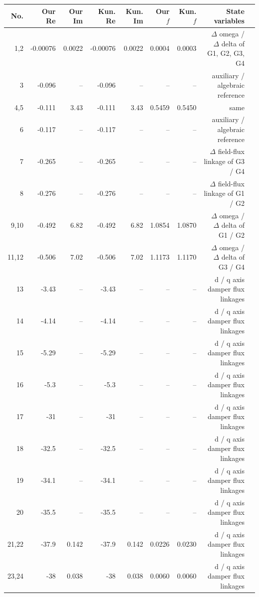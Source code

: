 \begingroup\scriptsize\setlength{\tabcolsep}{3pt}
\begin{tabularx}{\textwidth}{@{}r rrr rrr r X@{}}
\toprule
No. & Our Re & Our Im & Kun. Re & Kun. Im & Our $f$ & Kun. $f$ & State variables\\
\midrule
1,2 & -0.00076 & 0.0022 & -0.00076 & 0.0022 & 0.0004 & 0.0003 & $\Delta$ omega / $\Delta$ delta of G1, G2, G3, G4\\
3 & -0.096 & -- & -0.096 & -- & -- & -- & auxiliary / algebraic reference\\
4,5 & -0.111 & 3.43 & -0.111 & 3.43 & 0.5459 & 0.5450 & same\\
6 & -0.117 & -- & -0.117 & -- & -- & -- & auxiliary / algebraic reference\\
7 & -0.265 & -- & -0.265 & -- & -- & -- & $\Delta$ field-flux linkage of G3 / G4\\
8 & -0.276 & -- & -0.276 & -- & -- & -- & $\Delta$ field-flux linkage of G1 / G2\\
9,10 & -0.492 & 6.82 & -0.492 & 6.82 & 1.0854 & 1.0870 & $\Delta$ omega / $\Delta$ delta of G1 / G2\\
11,12 & -0.506 & 7.02 & -0.506 & 7.02 & 1.1173 & 1.1170 & $\Delta$ omega / $\Delta$ delta of G3 / G4\\
13 & -3.43 & -- & -3.43 & -- & -- & -- & d / q axis damper flux linkages\\
14 & -4.14 & -- & -4.14 & -- & -- & -- & d / q axis damper flux linkages\\
15 & -5.29 & -- & -5.29 & -- & -- & -- & d / q axis damper flux linkages\\
16 & -5.3 & -- & -5.3 & -- & -- & -- & d / q axis damper flux linkages\\
17 & -31 & -- & -31 & -- & -- & -- & d / q axis damper flux linkages\\
18 & -32.5 & -- & -32.5 & -- & -- & -- & d / q axis damper flux linkages\\
19 & -34.1 & -- & -34.1 & -- & -- & -- & d / q axis damper flux linkages\\
20 & -35.5 & -- & -35.5 & -- & -- & -- & d / q axis damper flux linkages\\
21,22 & -37.9 & 0.142 & -37.9 & 0.142 & 0.0226 & 0.0230 & d / q axis damper flux linkages\\
23,24 & -38 & 0.038 & -38 & 0.038 & 0.0060 & 0.0060 & d / q axis damper flux linkages\\
\bottomrule
\end{tabularx}
\endgroup

